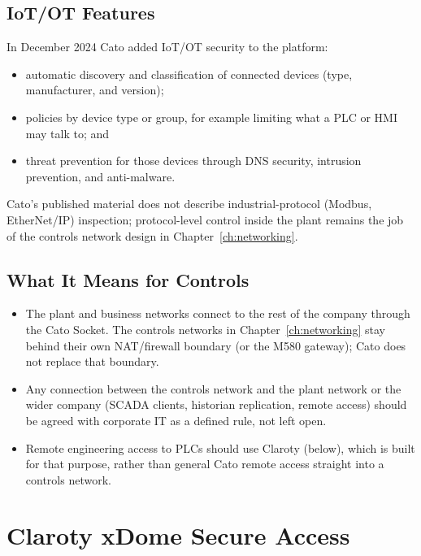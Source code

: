 \subsection{IoT/OT Features}
In December 2024 Cato added IoT/OT security to the platform:
\begin{itemize}[itemsep=1pt]
  \item automatic discovery and classification of connected devices (type, manufacturer, and version);
  \item policies by device type or group, for example limiting what a PLC or HMI may talk to; and
  \item threat prevention for those devices through DNS security, intrusion prevention, and anti-malware.
\end{itemize}
Cato's published material does not describe industrial-protocol (Modbus, EtherNet/IP) inspection; protocol-level control inside the plant remains the job of the controls network design in Chapter~\ref{ch:networking}.

\subsection{What It Means for Controls}
\begin{itemize}[itemsep=1pt]
  \item The plant and business networks connect to the rest of the company through the Cato Socket. The controls networks in Chapter~\ref{ch:networking} stay behind their own NAT/firewall boundary (or the M580 gateway); Cato does not replace that boundary.
  \item Any connection between the controls network and the plant network or the wider company (SCADA clients, historian replication, remote access) should be agreed with corporate IT as a defined rule, not left open.
  \item Remote engineering access to PLCs should use Claroty (below), which is built for that purpose, rather than general Cato remote access straight into a controls network.
\end{itemize}

\section{Claroty xDome Secure Access}
